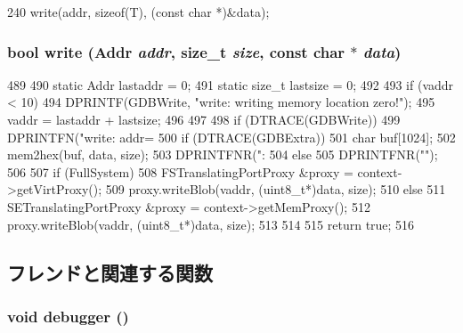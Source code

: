 \begin{DoxyCode}
240 { write(addr, sizeof(T), (const char *)&data); }
\end{DoxyCode}
\hypertarget{classBaseRemoteGDB_afbada55bb9d0e9c8c26bb48cb5890111}{
\subsubsection[{write}]{\setlength{\rightskip}{0pt plus 5cm}bool write ({\bf Addr} {\em addr}, \/  size\_\-t {\em size}, \/  const char $\ast$ {\em data})}}
\label{classBaseRemoteGDB_afbada55bb9d0e9c8c26bb48cb5890111}



\begin{DoxyCode}
489 {
490     static Addr lastaddr = 0;
491     static size_t lastsize = 0;
492 
493     if (vaddr < 10) {
494       DPRINTF(GDBWrite, "write: writing memory location zero!\n");
495       vaddr = lastaddr + lastsize;
496     }
497 
498     if (DTRACE(GDBWrite)) {
499         DPRINTFN("write: addr=%
500         if (DTRACE(GDBExtra)) {
501             char buf[1024];
502             mem2hex(buf, data, size);
503             DPRINTFNR(": %
504         } else
505             DPRINTFNR("\n");
506     }
507     if (FullSystem) {
508         FSTranslatingPortProxy &proxy = context->getVirtProxy();
509         proxy.writeBlob(vaddr, (uint8_t*)data, size);
510     } else {
511         SETranslatingPortProxy &proxy = context->getMemProxy();
512         proxy.writeBlob(vaddr, (uint8_t*)data, size);
513     }
514 
515     return true;
516 }
\end{DoxyCode}


\subsection{フレンドと関連する関数}
\hypertarget{classBaseRemoteGDB_a19c86e0d31779f284e91d4d016448264}{
\subsubsection[{debugger}]{\setlength{\rightskip}{0pt plus 5cm}void debugger ()}}
\label{classBaseRemoteGDB_a19c86e0d31779f284e91d4d016448264}



